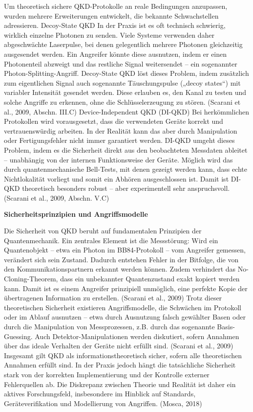 \noindent
Um theoretisch sichere QKD-Protokolle an reale Bedingungen anzupassen, wurden mehrere Erweiterungen entwickelt, die bekannte Schwachstellen adressieren.
Decoy-State QKD
In der Praxis ist es oft technisch schwierig, wirklich einzelne Photonen zu senden. Viele Systeme verwenden daher abgeschwächte Laserpulse, bei denen gelegentlich mehrere Photonen gleichzeitig ausgesendet werden. Ein Angreifer könnte diese ausnutzen, indem er einen Photonenteil abzweigt und das restliche Signal weitersendet – ein sogenannter Photon-Splitting-Angriff.
Decoy-State QKD löst dieses Problem, indem zusätzlich zum eigentlichen Signal auch sogenannte Täuschungspulse („decoy states“) mit variabler Intensität gesendet werden. Diese erlauben es, den Kanal zu testen und solche Angriffe zu erkennen, ohne die Schlüsselerzeugung zu stören.
 (Scarani et al., 2009, Abschn. III.C)
Device-Independent QKD (DI-QKD)
Bei herkömmlichen Protokollen wird vorausgesetzt, dass die verwendeten Geräte korrekt und vertrauenswürdig arbeiten. In der Realität kann das aber durch Manipulation oder Fertigungsfehler nicht immer garantiert werden.
DI-QKD umgeht dieses Problem, indem es die Sicherheit direkt aus den beobachteten Messdaten ableitet – unabhängig von der internen Funktionsweise der Geräte. Möglich wird das durch quantenmechanische Bell-Tests, mit denen gezeigt werden kann, dass echte Nichtlokalität vorliegt und somit ein Abhören ausgeschlossen ist. Damit ist DI-QKD theoretisch besonders robust – aber experimentell sehr anspruchsvoll.
 (Scarani et al., 2009, Abschn. V.C)

\vspace{1em}
\noindent\textbf{Sicherheitsprinzipien und Angriffsmodelle}

\noindent
Die Sicherheit von QKD beruht auf fundamentalen Prinzipien der Quantenmechanik. Ein zentrales Element ist die Messstörung: Wird ein Quantenobjekt – etwa ein Photon im BB84-Protokoll – vom Angreifer gemessen, verändert sich sein Zustand. Dadurch entstehen Fehler in der Bitfolge, die von den Kommunikationspartnern erkannt werden können. Zudem verhindert das No-Cloning-Theorem, dass ein unbekannter Quantenzustand exakt kopiert werden kann. Damit ist es einem Angreifer prinzipiell unmöglich, eine perfekte Kopie der übertragenen Information zu erstellen.
 (Scarani et al., 2009)
Trotz dieser theoretischen Sicherheit existieren Angriffsmodelle, die Schwächen im Protokoll oder im Ablauf ausnutzen – etwa durch Ausnutzung falsch gewählter Basen oder durch die Manipulation von Messprozessen, z.B. durch das sogenannte Basis-Guessing. Auch Detektor-Manipulationen werden diskutiert, sofern Annahmen über das ideale Verhalten der Geräte nicht erfüllt sind.
 (Scarani et al., 2009)
Insgesamt gilt QKD als informationstheoretisch sicher, sofern alle theoretischen Annahmen erfüllt sind. In der Praxis jedoch hängt die tatsächliche Sicherheit stark von der korrekten Implementierung und der Kontrolle externer Fehlerquellen ab. Die Diskrepanz zwischen Theorie und Realität ist daher ein aktives Forschungsfeld, insbesondere im Hinblick auf Standards, Geräteverifikation und Modellierung von Angriffen.
 (Mosca, 2018)


